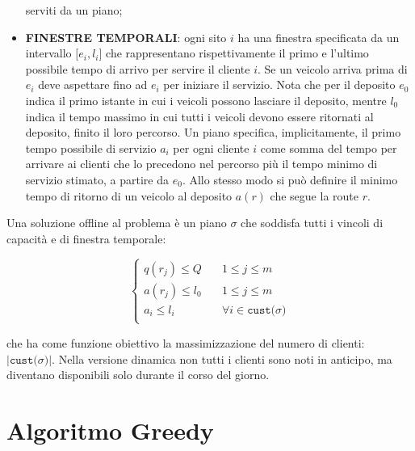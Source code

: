 \documentclass[
]{article}
\begin{document}
\begin{itemize}
  serviti da un piano;
\item
  \textbf{FINESTRE TEMPORALI}: ogni sito {\(i\)} ha una finestra
  specificata da un intervallo {\(\lbrack e_{i},l_{i}\rbrack\)} che
  rappresentano rispettivamente il primo e l'ultimo possibile tempo di
  arrivo per servire il cliente {\(i\)}. Se un veicolo arriva prima di
  {\(e_{i}\)} deve aspettare fino ad {\(e_{i}\)} per iniziare il
  servizio. Nota che per il deposito {\(e_{0}\)} indica il primo istante
  in cui i veicoli possono lasciare il deposito, mentre {\(l_{0}\)}
  indica il tempo massimo in cui tutti i veicoli devono essere ritornati
  al deposito, finito il loro percorso. Un piano specifica, implicitamente, il primo tempo possibile di servizio {\(a_{i}\)} per
  ogni cliente {\(i\)} come somma del tempo per arrivare ai clienti che
  lo precedono nel percorso più il tempo minimo di servizio stimato, a
  partire da {\(e_{0}\)}. Allo stesso modo si può definire il minimo
  tempo di ritorno di un veicolo al deposito {\(a(r)\)} che segue la
  route {\(r\)}.
\end{itemize}

Una soluzione offline al problema è un piano {\(\sigma\)} che soddisfa
tutti i vincoli di capacità e di finestra temporale:

\begin{equation*}
    \begin{cases}
{q(r_{j}) \leq Q\quad} & {1 \leq j \leq m} \\
{a(r_{j}) \leq l_{0}} & {1 \leq j \leq m} \\
{a_{i} \leq l_{i}} & {\forall i \in \texttt{cust(}\sigma\texttt{)}} \\
\end{cases}
\end{equation*} 

che ha come funzione obiettivo la massimizzazione del numero di clienti:
{\(|\texttt{cust(}\sigma\texttt{)}|\)}. Nella versione dinamica non
tutti i clienti sono noti in anticipo, ma diventano disponibili solo
durante il corso del giorno.

\hypertarget{algoritmo-greedy}{%
\section{Algoritmo Greedy}\label{algoritmo-greedy}}
\end{document}
